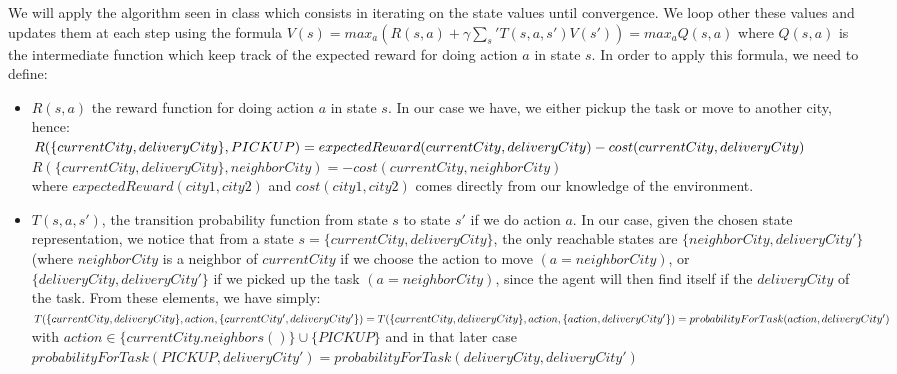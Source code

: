 \documentclass[11pt]{article}
\begin{document}
We will apply the algorithm seen in class which consists in iterating on the state values until convergence. We loop other these values and updates them at each step using the formula $V(s)=max_a{(R(s,a)+\gamma \sum_s'{T(s,a,s')V(s')})}=max_a{Q(s,a)}$ where $Q(s,a)$ is the intermediate function which keep track of the expected reward for doing action $a$ in state $s$.\newline
In order to apply this formula, we need to define:
\begin{itemize}
\item $R(s,a)$ the reward function for doing action $a$ in state $s$. In our case we have, we either pickup the task or move to another city, hence: \\
$R( \{currentCity,deliveryCity \},PICKUP) = expectedReward(currentCity,deliveryCity) \\ -cost(currentCity,deliveryCity)$ \\
$R( \{currentCity,deliveryCity \},neighborCity) = -cost(currentCity,neighborCity)$ \\
where $expectedReward(city1,city2)$ and $cost(city1,city2)$ comes directly from our knowledge of the environment.

\item $T(s,a,s')$, the transition probability function from state $s$ to state $s'$ if we do action $a$. In our case, given the chosen state representation, we notice that from a state $s= \{currentCity,deliveryCity \}$, the only reachable states are $\{neighborCity,deliveryCity'\}$ (where $neighborCity$ is a neighbor of $currentCity$ if we choose the action to move $(a=neighborCity)$, or $\{deliveryCity,deliveryCity'\}$ if we picked up the task $(a=neighborCity)$, since the agent will then find itself if the $deliveryCity$ of the task. \newline
From these elements, we have simply: \newline
$T(\{currentCity,deliveryCity\},action,\{currentCity',deliveryCity'\}) \\
=T(\{currentCity,deliveryCity\},action,\{action,deliveryCity'\}) \\ =probabilityForTask(action,deliveryCity')$
with $action \in \{currentCity.neighbors()\} \cup \{PICKUP\}$ and in that later case \\ $probabilityForTask(PICKUP,deliveryCity')=probabilityForTask(deliveryCity,deliveryCity')$
\end{itemize}
\end{document}
